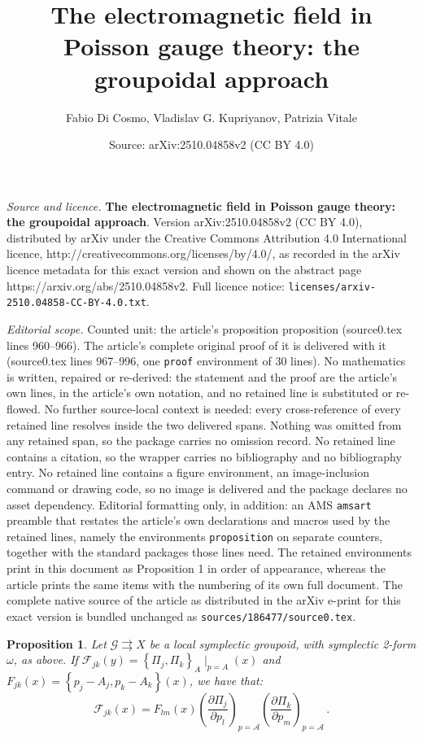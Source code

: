 \documentclass[10pt,a4paper]{amsart}
\title{{\bf The electromagnetic field in Poisson gauge theory: the groupoidal approach}}
\author{Fabio Di Cosmo, Vladislav G. Kupriyanov, Patrizia Vitale}
\date{Source: arXiv:2510.04858v2 (CC BY 4.0)}
\newtheorem{proposition}{Proposition}
\newcommand{\cG}{\mathcal{G}}
\begin{document}
\maketitle

\noindent\emph{Source and licence.} {\bf The electromagnetic field in Poisson gauge theory: the groupoidal approach}. Version arXiv:2510.04858v2 (CC BY 4.0), distributed by arXiv under the Creative Commons Attribution 4.0 International licence, http://creativecommons.org/licenses/by/4.0/, as recorded in the arXiv licence metadata for this exact version and shown on the abstract page https://arxiv.org/abs/2510.04858v2. Full licence notice: \texttt{licenses/arxiv-2510.04858-CC-BY-4.0.txt}.\par\smallskip

\noindent\textit{Editorial scope.} Counted unit: the article's proposition proposition (source0.tex lines 960--966). The article's complete original proof of it is delivered with it (source0.tex lines 967--996, one \texttt{proof} environment of 30 lines). No mathematics is written, repaired or re-derived: the statement and the proof are the article's own lines, in the article's own notation, and no retained line is substituted or re-flowed.  No further source-local context is needed: every cross-reference of every retained line resolves inside the two delivered spans.  Nothing was omitted from any retained span, so the package carries no omission record.  No retained line contains a citation, so the wrapper carries no bibliography and no bibliography entry.  No retained line contains a figure environment, an image-inclusion command or drawing code, so no image is delivered and the package declares no asset dependency.  Editorial formatting only, in addition: an AMS \texttt{amsart} preamble that restates the article's own declarations and macros used by the retained lines, namely the environments \texttt{proposition} on separate counters, together with the standard packages those lines need.  The retained environments print in this document as Proposition 1 in order of appearance, whereas the article prints the same items with the numbering of its own full document.  The complete native source of the article as distributed in the arXiv e-print for this exact version is bundled unchanged as \texttt{sources/186477/source0.tex}.
\begin{proposition}
Let $\cG\rightrightarrows X$ be a local symplectic groupoid, with symplectic 2-form $\omega$, as above. 
If ${\mathcal{F}}_{jk}(y)=\left\lbrace \Pi_j,\Pi_k \right\rbrace_A\mid_{p=A}(x)$ and $F_{jk}(x)=\left\lbrace p_j-A_j,p_k-A_k \right\rbrace (x)$, we have that:
\begin{equation}
\mathcal{F}_{jk}(x) = F_{lm}(x) \left( \frac{\partial \Pi_j}{\partial p_l}\right)_{p=\mathcal{A}} \left( \frac{\partial \Pi_k}{\partial p_m} \right)_{p=\mathcal{A}}\,.    
\end{equation}
\end{proposition}
\end{document}
